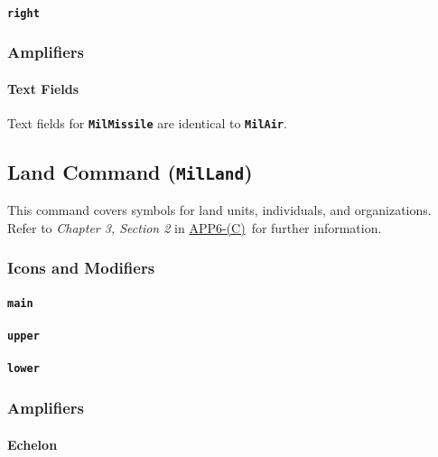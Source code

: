 \documentclass[a4paper, titlepage]{article}
\newcommand\DocLink{\href{https://www.awl.edu.pl/images/en/APP_6_C.pdf}{APP6-(C)}}
\begin{document}
\paragraph{\texttt{right}}\quad


\subsubsection{Amplifiers}

\paragraph{Text Fields}

Text fields for \textbf{\texttt{MilMissile}} are identical to \textbf{\texttt{MilAir}}.

\subsection{Land Command (\textbf{\texttt{MilLand}})}

This command covers symbols for land units, individuals, and organizations. Refer to \textit{Chapter 3, Section 2} in \DocLink\ for further information.

\subsubsection{Icons and Modifiers}

\paragraph{\texttt{main}}
%

\paragraph{\texttt{upper}}
%

\paragraph{\texttt{lower}}
%

\subsubsection{Amplifiers}

\paragraph{Echelon}
\end{document}
